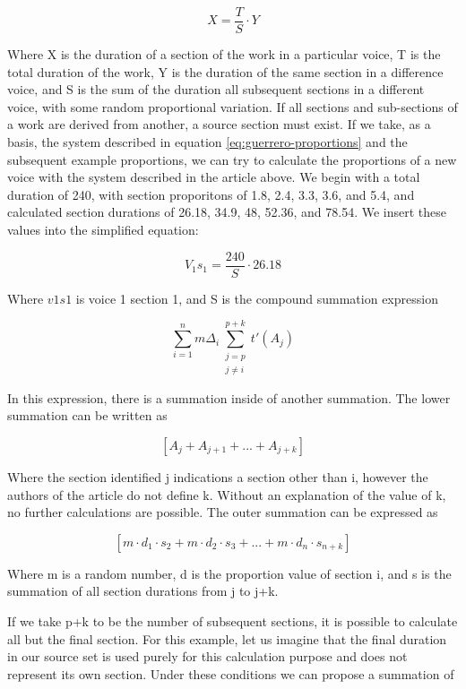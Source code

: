 \begin{equation}
X = \frac{T}{S} \cdot Y
\end{equation}

Where X is the duration of a section of the work in a particular voice, T is the total duration of the work, Y is the duration of the same section in a difference voice, and S is the sum of the duration all subsequent sections in a different voice, with some random proportional variation. If all sections and sub-sections of a work are derived from another, a source section must exist. If we take, as a basis, the system described in equation \vref{eq:guerrero-proportions} and the subsequent example proportions, we can try to calculate the proportions of a new voice with the system described in the article above. We begin with a total duration of 240, with section proporitons of 1.8, 2.4, 3.3, 3.6, and 5.4, and calculated section durations of 26.18, 34.9, 48, 52.36, and 78.54. We insert these values into the simplified equation:

\begin{equation}
V_{1}s_{1} = \frac{240}{S} \cdot 26.18
\end{equation}

Where $v1s1$ is voice 1 section 1, and S is the compound summation expression

\begin{equation}
\displaystyle\sum_{i=1}^{n} m \Delta_{i} \textstyle\sum_{\substack{j=p\\ j \neq i}}^{p+k} t'(A_{j})
\end{equation}

In this expression, there is a summation inside of another summation. The lower summation can be written as

\[
[A_{j} + A_{j + 1} + ... + A_{j+k}]
\]

Where the section identified j indications a section other than i, however the authors of the article do not define k. Without an explanation of the value of k, no further calculations are possible. The outer summation can be expressed as

\[
[m \cdot d_{1} \cdot s_{2} + m \cdot d_{2} \cdot s_{3} + ... + m \cdot d_{n} \cdot s_{n+k}]
\]

Where m is a random number, d is the proportion value of section i, and s is the summation of all section durations from j to j+k.

If we take p+k to be the number of subsequent sections, it is possible to calculate all but the final section. For this example, let us imagine that the final duration in our source set is used purely for this calculation purpose and does not represent its own section. Under these conditions we can propose a summation of

